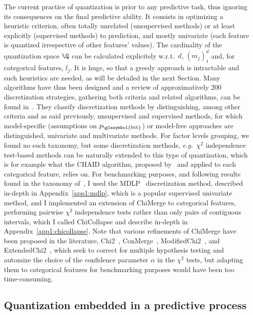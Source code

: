 The current practice of quantization is prior to any predictive task, thus ignoring its consequences on the final predictive ability. It consists in optimizing a heuristic criterion, often totally unrelated (unsupervised methods) or at least explicitly (supervised methods) to prediction, and mostly univariate (each feature is quantized irrespective of other features' values). The cardinality of the quantization space $\Q$ can be calculated explicitely w.r.t.\ $d$, $(m_j)_1^d$ and, for categorical features, $l_j$. It is huge, so that a greedy approach is intractable and such heuristics are needed, as will be detailed in the next Section.
Many algorithms have thus been designed and a review of approximatively 200 discretization strategies, gathering both criteria and related algorithms, can be found in~\cite{ramirez2016data}. They classify discretization methods by distinguishing, among other criteria and as said previously, unsupervised and supervised methods, for which model-specific (assumptions on $p_{\glssymbol{bth}}$) or model-free approaches are distinguished, univariate and multivariate methods. For factor levels grouping, we found no such taxonomy, but some discretization methods, \textit{e.g.}\ $\chi^2$ independence test-based methods can be naturally extended to this type of quantization, which is for example what the CHAID algorithm, proposed by~\cite{kass1980exploratory} and applied to each categorical feature, relies on.
For benchmarking purposes, and following results found in the taxonomy of~\cite{ramirez2016data}, I used the MDLP~\cite{mdlp} discretization method, described in-depth in Appendix~\ref{app1:mdlp}, which is a popular supervised univariate method, and I implemented an extension of ChiMerge to categorical features, performing pairwise $\chi^2$ independence tests rather than only pairs of contiguous intervals, which I called ChiCollapse and describe in-depth in Appendix~\ref{app1:chicollapse}. Note that various refinements of ChiMerge have been proposed in the literature, Chi2~\cite{liu1995chi2}, ConMerge~\cite{wang1998concurrent}, ModifiedChi2~\cite{tay2002modified}, and ExtendedChi2~\cite{su2005extended}, which seek to correct for multiple hypothesis testing and automize the choice of the confidence parameter $\alpha$ in the $\chi^2$ tests, but adapting them to categorical features for benchmarking purposes would have been too time-consuming.


\subsection{Quantization embedded in a predictive process}

